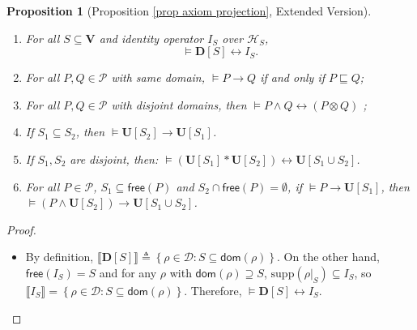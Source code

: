 \documentclass[conference,compsoc, 10pt]{IEEEtran}
\newtheorem{proposition}{Proposition}[section]
\newcommand {\cD } {{\mathcal{D}}}
\newcommand {\cP } {{\mathcal{P}}}
\newcommand {\cH } {{\mathcal{H}}}
\newcommand {\id } {{I}}
\newcommand {\bD} {{\mathbf{D}}}
\newcommand {\dom }[1] {{\mathsf{dom}\!\left(#1\right)}}
\newcommand {\free }[1] {{\mathsf{free}\left(#1\right)}}
\newcommand {\rt }[2] {{\left.{#1}\right|_{#2}}}
\newcommand {\vars } {\mathbf{V}}
\newcommand {\varb } {\mathsf{var}_{\mathbf{B}}}
\newcommand {\uni } {{\mathbf{U}}}
\newcommand {\unia } {{\mathbf{U}}}
\newcommand {\inu } {{\mathbf{Inu}}}
\newcommand {\ip } {{\mathbf{IP}}}
\newcommand {\sem}[1] {\llbracket#1\rrbracket}
\newcommand {\supp } {{\mathrm{supp}}}
\newcommand{\sd}{\diamond}%
\newcommand{\qvee}{\sqcup}
\newcommand{\qwedge}{\sqcap}
\DeclareRobustCommand{\gimplr}{%
	\mathbin{\ooalign{$\leftrightarrow$\cr\hss\raisebox{1ex}{\scalebox{.5}{G}}\hss}}}
\begin{document}
\begin{appendices}
		\begin{proposition}[Proposition \ref{prop axiom projection}, Extended Version]
			\label{prop axiom projection extend}
			\begin{enumerate}
				\item For all $S\subseteq \vars$ and identity operator $I_S$ over $\cH_S$, $$\models \bD[S]\leftrightarrow \id_{S}.$$ %
				\item For all $P,Q\in\cP$ with same domain, $\models P\rightarrow Q$ if and only if $P \sqsubseteq Q$;
				\item For all $P,Q\in\cP$ with disjoint domains, then
				$\models  P\wedge Q \leftrightarrow (P\otimes Q)$ ;   	%
				\item If $S_1\subseteq S_2$, then $\models\unia[S_2]\rightarrow\unia[S_1]$.
				\item If $S_1, S_2$ are disjoint, then:
				$ \models(\unia[S_1]\ast\unia[S_2])\leftrightarrow\unia[S_1\cup S_2] $. 
				\item For all $P\in\cP$, $S_1\subseteq\free{P}$ and $S_2\cap\free{P} = \emptyset$, if $\models P\rightarrow\unia[S_1]$, then $\models (P\wedge\unia[S_2])\rightarrow \unia[S_1\cup S_2]$. 
			\end{enumerate}
		\end{proposition}
		
		\begin{proof}
			\begin{itemize}
				\item By definition, $\sem{\bD[S]} \triangleq \left\{\rho\in\cD: S\subseteq\dom{\rho}\right\}$. On the other hand, $\free {I_S} = S$ and for any $\rho$ with $\dom {\rho}\supseteq S$, $\supp(\rt {\rho}{S})\subseteq I_S$, so 
				$\sem{I_S} = \left\{\rho\in\cD: S\subseteq\dom{\rho}\right\}$. Therefore, 
				$\models \bD[S]\leftrightarrow \id_{S}.$
				

\end{itemize}
\end{proof}
\end{appendices}
\end{document}
